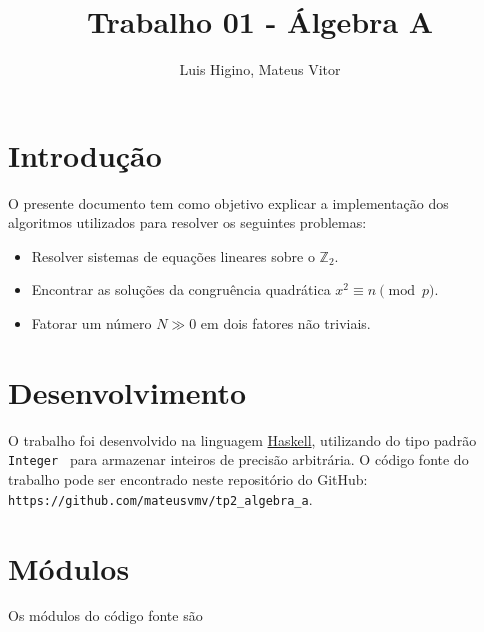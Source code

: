 \documentclass{article}
\title{Trabalho 01 - Álgebra A}
\author{Luis Higino, Mateus Vitor}
\begin{document}
\maketitle

\section{Introdução}
\label{intro}
O presente documento tem como objetivo explicar a implementação dos algoritmos utilizados para resolver os seguintes problemas:
\begin{itemize}
    \item Resolver sistemas de equações lineares sobre o $\mathbb{Z}_2$.
    \item Encontrar as soluções da congruência quadrática $x^2 \equiv n \pmod{p}$.
    \item Fatorar um número $N \gg 0$ em dois fatores não triviais.
\end{itemize} 
\section{Desenvolvimento}

O trabalho foi desenvolvido na linguagem \href{https://www.haskell.org/}{Haskell}, utilizando do tipo padrão \verb| Integer | para armazenar inteiros de precisão arbitrária. O código fonte do trabalho pode ser encontrado neste repositório do GitHub:
\\\verb|https://github.com/mateusvmv/tp2_algebra_a|.

\section{Módulos}

Os módulos do código fonte são

\end{document}
